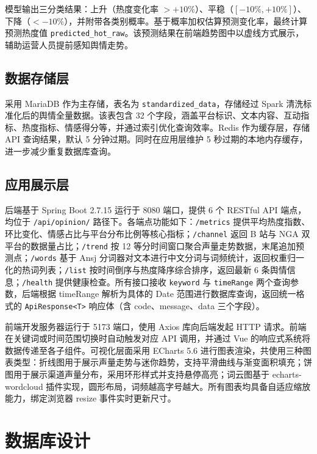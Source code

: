 模型输出三分类结果：上升（热度变化率 $> +10\%$）、平稳（$[-10\%, +10\%]$）、下降（$<-10\%$），并附带各类别概率。基于概率加权估算预测变化率，最终计算预测热度值 \texttt{predicted\_hot\_raw}。该预测结果在前端趋势图中以虚线方式展示，辅助运营人员提前感知舆情走势。

\subsection{数据存储层}

采用 MariaDB 作为主存储，表名为 \texttt{standardized\_data}，存储经过 Spark 清洗标准化后的舆情全量数据。该表包含 32 个字段，涵盖平台标识、文本内容、互动指标、热度指标、情感得分等，并通过索引优化查询效率。Redis 作为缓存层，存储 API 查询结果，默认 5 分钟过期。同时在应用层维护 5 秒过期的本地内存缓存，进一步减少重复数据库查询。

\subsection{应用展示层}

后端基于 Spring Boot 2.7.15 运行于 8080 端口，提供 6 个 RESTful API 端点，均位于 \texttt{/api/opinion/} 路径下。各端点功能如下：\texttt{/metrics} 提供平均热度指数、环比变化、情感占比与平台分布比例等核心指标；\texttt{/channel} 返回 B 站与 NGA 双平台的数据量占比；\texttt{/trend} 按 12 等分时间窗口聚合声量走势数据，末尾追加预测点；\texttt{/words} 基于 Ansj 分词器对文本进行中文分词与词频统计，返回权重归一化的热词列表；\texttt{/list} 按时间倒序与热度降序综合排序，返回最新 6 条舆情信息；\texttt{/health} 提供健康检查。所有接口接收 \texttt{keyword} 与 \texttt{timeRange} 两个查询参数，后端根据 timeRange 解析为具体的 Date 范围进行数据库查询，返回统一格式的 \texttt{ApiResponse<T>} 响应体（含 code、message、data 三个字段）。

前端开发服务器运行于 5173 端口，使用 Axios 库向后端发起 HTTP 请求。前端在关键词或时间范围切换时自动触发对应 API 调用，并通过 Vue 的响应式系统将数据传递至各子组件。可视化层面采用 ECharts 5.6 进行图表渲染，共使用三种图表类型：折线图用于展示声量走势与迷你趋势，支持平滑曲线与渐变面积填充；饼图用于展示渠道声量分布，采用环形样式并支持悬停高亮；词云图基于 echarts-wordcloud 插件实现，圆形布局，词频越高字号越大。所有图表均具备自适应缩放能力，绑定浏览器 resize 事件实时更新尺寸。

\section{数据库设计}

